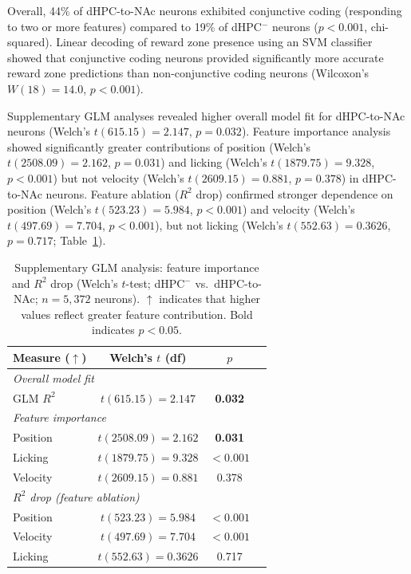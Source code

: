 \documentclass[11pt]{article}
\begin{document}
Overall, 44\% of dHPC-to-NAc neurons exhibited conjunctive coding (responding to two or more features) compared to 19\% of dHPC$^{-}$ neurons ($p<0.001$, chi-squared). Linear decoding of reward zone presence using an SVM classifier showed that conjunctive coding neurons provided significantly more accurate reward zone predictions than non-conjunctive coding neurons (Wilcoxon's $W(18)=14.0$, $p<0.001$).

Supplementary GLM analyses revealed higher overall model fit for dHPC-to-NAc neurons (Welch's $t(615.15)=2.147$, $p=0.032$). Feature importance analysis showed significantly greater contributions of position (Welch's $t(2508.09)=2.162$, $p=0.031$) and licking (Welch's $t(1879.75)=9.328$, $p<0.001$) but not velocity (Welch's $t(2609.15)=0.881$, $p=0.378$) in dHPC-to-NAc neurons. Feature ablation ($R^{2}$ drop) confirmed stronger dependence on position (Welch's $t(523.23)=5.984$, $p<0.001$) and velocity (Welch's $t(497.69)=7.704$, $p<0.001$), but not licking (Welch's $t(552.63)=0.3626$, $p=0.717$; Table~\ref{tab:glmsup}).

\begin{table}[H]
\centering
\caption{Supplementary GLM analysis: feature importance and $R^{2}$ drop (Welch's $t$-test; dHPC$^{-}$ vs.\ dHPC-to-NAc; $n=5{,}372$ neurons). $\uparrow$ indicates that higher values reflect greater feature contribution. Bold indicates $p<0.05$.}
\label{tab:glmsup}
\begin{tabular}{lccc}
\toprule
Measure ($\uparrow$) & Welch's $t$ (df) & $p$ \\
\midrule
\multicolumn{3}{l}{\textit{Overall model fit}} \\
GLM $R^{2}$ & $t(615.15)=\mathbf{2.147}$ & \textbf{0.032} \\
\midrule
\multicolumn{3}{l}{\textit{Feature importance}} \\
Position & $t(2508.09)=\mathbf{2.162}$ & \textbf{0.031} \\
Licking & $t(1879.75)=\mathbf{9.328}$ & $<0.001$ \\
Velocity & $t(2609.15)=0.881$ & 0.378 \\
\midrule
\multicolumn{3}{l}{\textit{$R^{2}$ drop (feature ablation)}} \\
Position & $t(523.23)=\mathbf{5.984}$ & $<0.001$ \\
Velocity & $t(497.69)=\mathbf{7.704}$ & $<0.001$ \\
Licking & $t(552.63)=0.3626$ & 0.717 \\
\bottomrule
\end{tabular}
\end{table}
\end{document}
